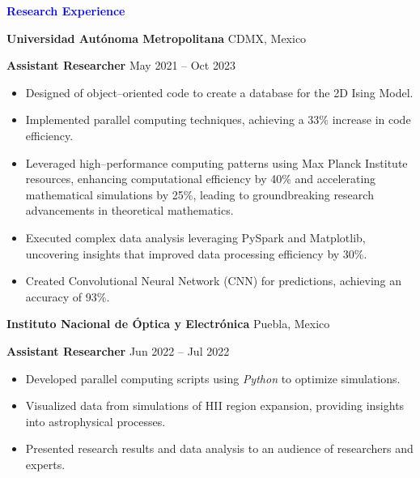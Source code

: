 \documentclass[10pt]{article}
\begin{document}
\vspace{12pt}
\begin{center}
    \textbf{\textcolor{blue}{Research Experience}}
\end{center}

\vspace{12pt}



\textbf{Universidad Autónoma Metropolitana} \hfill CDMX, Mexico

\textbf{Assistant Researcher} \hfill May 2021 – Oct 2023
\begin{itemize}[noitemsep, topsep=0pt, partopsep=0pt, parsep=0pt]
    \item Designed of object–oriented code to create a database for the 2D Ising Model.
    \item Implemented parallel computing techniques, achieving a 33\% increase in code efficiency.
    \item Leveraged high–performance computing patterns using Max Planck Institute resources, enhancing computational efficiency by 40\% and accelerating mathematical simulations by 25\%, leading to groundbreaking research advancements in theoretical mathematics.
    \item Executed complex data analysis leveraging PySpark and Matplotlib, uncovering insights that improved data processing efficiency by 30\%.
    \item Created Convolutional Neural Network (CNN) for predictions, achieving an accuracy of 93\%.
\end{itemize}

\vspace{12pt}

\textbf{Instituto Nacional de Óptica y Electrónica} \hfill Puebla, Mexico

\textbf{Assistant Researcher} \hfill Jun 2022 – Jul 2022
\begin{itemize}[noitemsep, topsep=0pt, partopsep=0pt, parsep=0pt]
    \item Developed parallel computing scripts using \textit{Python} to optimize simulations.
    \item Visualized data from simulations of HII region expansion, providing insights into astrophysical processes.
    \item Presented research results and data analysis to an audience of researchers and experts.
\end{itemize}

\vspace{12pt}
\end{document}
